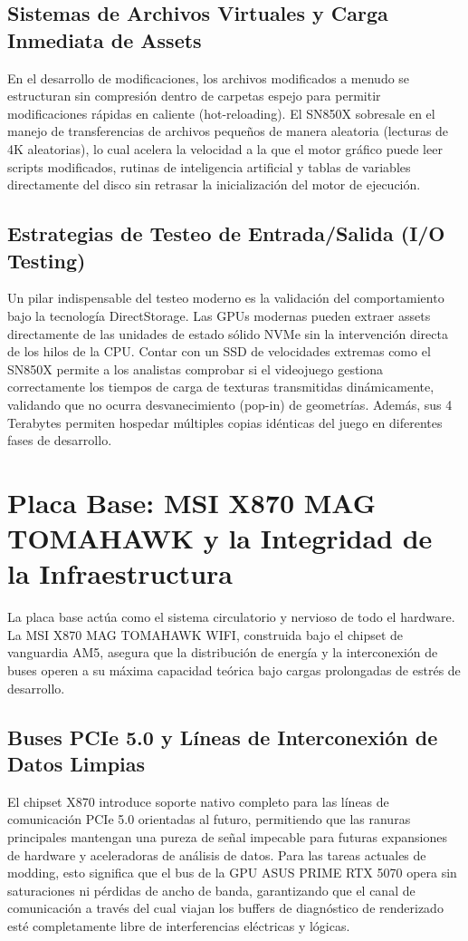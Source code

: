\documentclass[12pt,a4paper]{article}
\begin{document}
\subsection{Sistemas de Archivos Virtuales y Carga Inmediata de Assets}
En el desarrollo de modificaciones, los archivos modificados a menudo se estructuran sin compresión dentro de carpetas espejo para permitir modificaciones rápidas en caliente (hot-reloading). El SN850X sobresale en el manejo de transferencias de archivos pequeños de manera aleatoria (lecturas de 4K aleatorias), lo cual acelera la velocidad a la que el motor gráfico puede leer scripts modificados, rutinas de inteligencia artificial y tablas de variables directamente del disco sin retrasar la inicialización del motor de ejecución.

\subsection{Estrategias de Testeo de Entrada/Salida (I/O Testing)}
Un pilar indispensable del testeo moderno es la validación del comportamiento bajo la tecnología DirectStorage. Las GPUs modernas pueden extraer assets directamente de las unidades de estado sólido NVMe sin la intervención directa de los hilos de la CPU. Contar con un SSD de velocidades extremas como el SN850X permite a los analistas comprobar si el videojuego gestiona correctamente los tiempos de carga de texturas transmitidas dinámicamente, validando que no ocurra desvanecimiento (pop-in) de geometrías. Además, sus 4 Terabytes permiten hospedar múltiples copias idénticas del juego en diferentes fases de desarrollo.

\newpage

\section{Placa Base: MSI X870 MAG TOMAHAWK y la Integridad de la Infraestructura}

La placa base actúa como el sistema circulatorio y nervioso de todo el hardware. La MSI X870 MAG TOMAHAWK WIFI, construida bajo el chipset de vanguardia AM5, asegura que la distribución de energía y la interconexión de buses operen a su máxima capacidad teórica bajo cargas prolongadas de estrés de desarrollo.

\subsection{Buses PCIe 5.0 y Líneas de Interconexión de Datos Limpias}
El chipset X870 introduce soporte nativo completo para las líneas de comunicación PCIe 5.0 orientadas al futuro, permitiendo que las ranuras principales mantengan una pureza de señal impecable para futuras expansiones de hardware y aceleradoras de análisis de datos. Para las tareas actuales de modding, esto significa que el bus de la GPU ASUS PRIME RTX 5070 opera sin saturaciones ni pérdidas de ancho de banda, garantizando que el canal de comunicación a través del cual viajan los buffers de diagnóstico de renderizado esté completamente libre de interferencias eléctricas y lógicas.
\end{document}
